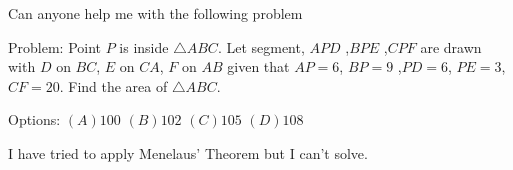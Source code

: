 Can anyone help me with the following problem

Problem: Point $P$ is inside $\triangle ABC$. Let segment, $APD$ ,$BPE$ ,$CPF$ are drawn with $D$ on $BC$, $E$ on $CA$,  $F$ on $AB$ given that $AP=6$, $BP=9$ ,$PD=6$, $PE=3$, $CF=20$. Find the area of $\triangle ABC$.

Options: $(A) 100$  $(B) 102$ $(C) 105$ $(D) 108$



I have tried to apply Menelaus' Theorem but I can't solve.
